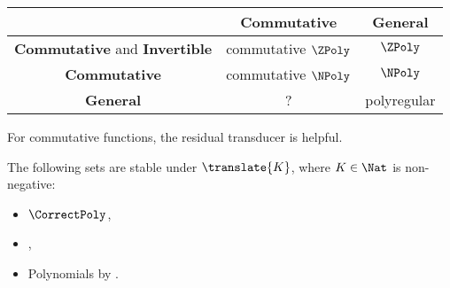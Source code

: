 \begin{center}
    \begin{tabular}{c|cc}
        \toprule
        & \textbf{Commutative} & \textbf{General} \\
        \midrule
        \textbf{Commutative}
        and \textbf{Invertible} & commutative $\ZPoly$ & $\ZPoly$ \\
        \textbf{Commutative} & commutative $\NPoly$ & $\NPoly$ \\
        \textbf{General} & ? & polyregular 
    \end{tabular}
\end{center}


\begin{conjecture}
    For commutative functions, the residual transducer 
    is helpful.
\end{conjecture}

\begin{fact}
    \label{translation-invariance:fact}
    The following sets are stable under 
    $\translate{K}$,
    where $K \in \Nat$ is non-negative:
    \begin{itemize}
        \item $\CorrectPoly$,
        \item {},
        \item Polynomials 
            by .
    \end{itemize}
\end{fact}

